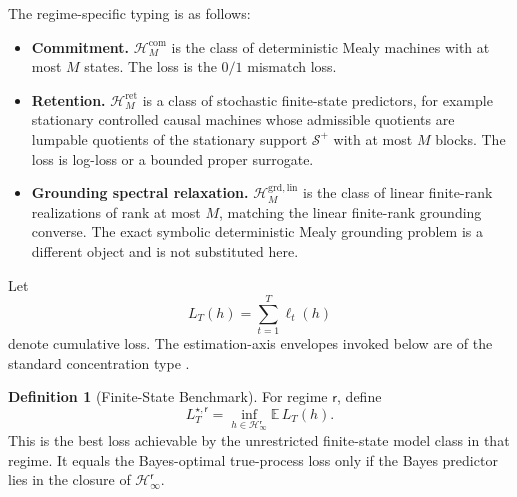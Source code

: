 \documentclass[12pt]{article}
\theoremstyle{definition}
\newtheorem{definition}[theorem]{Definition}
\newcommand{\Hcal}{\mathcal H}
\newcommand{\Splus}{\mathcal S^{+}}
\begin{document}
The regime-specific typing is as follows:
\begin{itemize}[leftmargin=1.8em]
\item \textbf{Commitment.}
$\Hcal_M^{\mathrm{com}}$ is the class of deterministic Mealy machines with at
most $M$ states.  The loss is the $0/1$ mismatch loss.

\item \textbf{Retention.}
$\Hcal_M^{\mathrm{ret}}$ is a class of stochastic finite-state predictors,
for example stationary controlled causal machines whose admissible quotients
are lumpable quotients of the stationary support $\Splus$ with at most $M$
blocks.  The loss is log-loss or a bounded proper surrogate.

\item \textbf{Grounding spectral relaxation.}
$\Hcal_M^{\mathrm{grd,lin}}$ is the class of linear finite-rank realizations
of rank at most $M$, matching the linear finite-rank grounding converse.  The
exact symbolic deterministic Mealy grounding problem is a different object and
is not substituted here.
\end{itemize}

Let
\[
L_T(h)=\sum_{t=1}^T \ell_t(h)
\]
denote cumulative loss.  The estimation-axis envelopes invoked below are of the
standard concentration type \cite{boucheron2013}.

\begin{definition}[Finite-State Benchmark]
\label{def:finite-state-benchmark}
For regime $\mathsf r$, define
\[
L_T^{\star,\mathsf r}
=
\inf_{h\in \Hcal_\infty^{\mathsf r}}
\mathbb E\,L_T(h).
\]
This is the best loss achievable by the unrestricted finite-state model class
in that regime.  It equals the Bayes-optimal true-process loss only if the
Bayes predictor lies in the closure of $\Hcal_\infty^{\mathsf r}$.
\end{definition}
\end{document}
